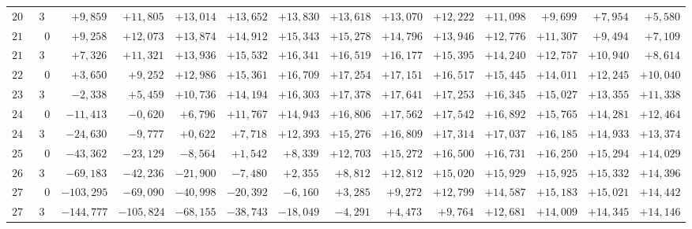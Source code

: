 \begin{landscape}
\begin{longtable}{@{}rr|r|r|r|r|r|r|r|r|r|r|r|r@{}}
\(202\) & \(30\) & \(+9{,}859\) & \(+11{,}805\) & \(+13{,}014\) & \(+13{,}652\) & \(+13{,}830\) & \(+13{,}618\) & \(+13{,}070\) & \(+12{,}222\) & \(+11{,}098\) & \(+9{,}699\) & \(+7{,}954\) & \(+5{,}580\)\\[2pt]
\(210\) & \(0\) & \(+9{,}258\) & \(+12{,}073\) & \(+13{,}874\) & \(+14{,}912\) & \(+15{,}343\) & \(+15{,}278\) & \(+14{,}796\) & \(+13{,}946\) & \(+12{,}776\) & \(+11{,}307\) & \(+9{,}494\) & \(+7{,}109\)\\
\(217\) & \(30\) & \(+7{,}326\) & \(+11{,}321\) & \(+13{,}936\) & \(+15{,}532\) & \(+16{,}341\) & \(+16{,}519\) & \(+16{,}177\) & \(+15{,}395\) & \(+14{,}240\) & \(+12{,}757\) & \(+10{,}940\) & \(+8{,}614\)\\
\(225\) & \(0\) & \(+3{,}650\) & \(+9{,}252\) & \(+12{,}986\) & \(+15{,}361\) & \(+16{,}709\) & \(+17{,}254\) & \(+17{,}151\) & \(+16{,}517\) & \(+15{,}445\) & \(+14{,}011\) & \(+12{,}245\) & \(+10{,}040\)\\
\(232\) & \(30\) & \(-2{,}338\) & \(+5{,}459\) & \(+10{,}736\) & \(+14{,}194\) & \(+16{,}303\) & \(+17{,}378\) & \(+17{,}641\) & \(+17{,}253\) & \(+16{,}345\) & \(+15{,}027\) & \(+13{,}355\) & \(+11{,}338\)\\[2pt]
\(240\) & \(0\) & \(-11{,}413\) & \(-0{,}620\) & \(+6{,}796\) & \(+11{,}767\) & \(+14{,}943\) & \(+16{,}806\) & \(+17{,}562\) & \(+17{,}542\) & \(+16{,}892\) & \(+15{,}765\) & \(+14{,}281\) & \(+12{,}464\)\\
\(247\) & \(30\) & \(-24{,}630\) & \(-9{,}777\) & \(+0{,}622\) & \(+7{,}718\) & \(+12{,}393\) & \(+15{,}276\) & \(+16{,}809\) & \(+17{,}314\) & \(+17{,}037\) & \(+16{,}185\) & \(+14{,}933\) & \(+13{,}374\)\\
\(255\) & \(0\) & \(-43{,}362\) & \(-23{,}129\) & \(-8{,}564\) & \(+1{,}542\) & \(+8{,}339\) & \(+12{,}703\) & \(+15{,}272\) & \(+16{,}500\) & \(+16{,}731\) & \(+16{,}250\) & \(+15{,}294\) & \(+14{,}029\)\\
\(262\) & \(30\) & \(-69{,}183\) & \(-42{,}236\) & \(-21{,}900\) & \(-7{,}480\) & \(+2{,}355\) & \(+8{,}812\) & \(+12{,}812\) & \(+15{,}020\) & \(+15{,}929\) & \(+15{,}925\) & \(+15{,}332\) & \(+14{,}396\)\\[2pt]
\(270\) & \(0\) & \(-103{,}295\) & \(-69{,}090\) & \(-40{,}998\) & \(-20{,}392\) & \(-6{,}160\) & \(+3{,}285\) & \(+9{,}272\) & \(+12{,}799\) & \(+14{,}587\) & \(+15{,}183\) & \(+15{,}021\) & \(+14{,}442\)\\
\(277\) & \(30\) & \(-144{,}777\) & \(-105{,}824\) & \(-68{,}155\) & \(-38{,}743\) & \(-18{,}049\) & \(-4{,}291\) & \(+4{,}473\) & \(+9{,}764\) & \(+12{,}681\) & \(+14{,}009\) & \(+14{,}345\) & \(+14{,}146\)\\

\end{longtable}
\end{landscape}
